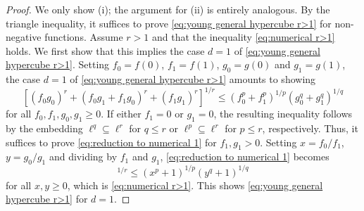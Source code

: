 \documentclass[reqno, 10pt]{amsart}
\theoremstyle{plain}
\numberwithin{equation}{section}
\theoremstyle{definition}
\newtheorem*{induction hypothesis}{Induction hypothesis}
\theoremstyle{remark}
\begin{document}
\begin{proof}
We only show (i); the argument for (ii) is entirely analogous. By the triangle inequality, it suffices to prove \eqref{eq:young general hypercube r>1} for non-negative functions. Assume $r>1$ and that the inequality \eqref{eq:numerical r>1} holds. We first show that this implies the case $d=1$ of \eqref{eq:young general hypercube r>1}.  Setting $f_0=f(0)$, $f_1=f(1)$, $g_0=g(0)$ and $g_1=g(1)$, the case $d=1$  of \eqref{eq:young general hypercube r>1} amounts to showing
\begin{equation}\label{eq:reduction to numerical 1}
    [ (f_0 g_0)^r + (f_0g_1 + f_1 g_0)^r +(f_1 g_1)^r ]^{1/r} \leq (f_0^p+f_1^p)^{1/p} (g_0^q+g_1^q)^{1/q}
\end{equation}
for all $f_0,f_1,g_0,g_1 \geq 0$.  If either $f_1=0$ or $g_1=0$, the resulting inequality follows by the embedding $\ell^q \subseteq \ell^r$ for $q \leq r$ or $\ell^p \subseteq \ell^r$ for $p \leq r$, respectively. Thus, it suffices to prove \eqref{eq:reduction to numerical 1} for $f_1, g_1 > 0$. Setting $x=f_0/f_1$, $y=g_0/g_1$ and dividing by $f_1$ and $g_1$, \eqref{eq:reduction to numerical 1} becomes
\begin{equation*}
    [ (x y)^r + (x  + y)^r +1 ]^{1/r} \leq (x^p+1)^{1/p} (y^q+1)^{1/q}
\end{equation*}
for all $x,y \geq 0$, which is \eqref{eq:numerical r>1}. This shows \eqref{eq:young general hypercube r>1} for $d=1$.


\end{proof}
\end{document}
